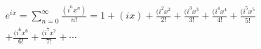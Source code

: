\documentclass[preview]{standalone}
\begin{document}
\begin{align*}
e^{ix} = \sum_{n=0}^{\infty} \frac{(i^nx^n)}{n!} = 1 + (ix) + \frac{(i^2x^2}{2!} + \frac{(i^3x^3}{3!} + \frac{(i^4x^4}{4!} + \frac{(i^5x^5}{5!} \\ + \frac{(i^6x^6}{6!} + \frac{(i^7x^7}{7!} + \cdots
\end{align*}
\end{document}
